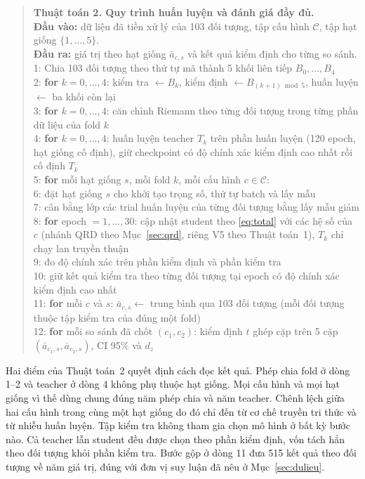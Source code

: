 \begin{quote}
\ttfamily\small\raggedright
\noindent\textbf{Thuật toán 2. Quy trình huấn luyện và đánh giá đầy đủ.}\\[2pt]
\textbf{Đầu vào:} dữ liệu đã tiền xử lý của 103 đối tượng, tập cấu hình
$\mathcal{C}$, tập hạt giống $\{1,\ldots,5\}$.\\
\textbf{Đầu ra:} giá trị theo hạt giống $\bar{a}_{c,s}$ và kết quả kiểm
định cho từng so sánh.\\[4pt]
1: \quad Chia 103 đối tượng theo thứ tự mã thành 5 khối liên tiếp
$B_0,\ldots,B_4$\\
2: \quad \textbf{for} $k = 0,\ldots,4$: kiểm tra $\leftarrow B_k$, kiểm định
$\leftarrow B_{(k+1) \bmod 5}$, huấn luyện $\leftarrow$ ba khối còn lại\\
3: \quad \textbf{for} $k = 0,\ldots,4$: căn chỉnh Riemann theo từng đối
tượng trong từng phần dữ liệu của fold $k$\\
4: \quad \textbf{for} $k = 0,\ldots,4$: huấn luyện teacher $T_k$ trên phần
huấn luyện (120 epoch, hạt giống cố định), giữ checkpoint có độ chính xác
kiểm định cao nhất rồi cố định $T_k$\\[4pt]
5: \quad \textbf{for} mỗi hạt giống $s$, mỗi fold $k$, mỗi cấu hình
$c \in \mathcal{C}$:\\
6: \quad \quad đặt hạt giống $s$ cho khởi tạo trọng số, thứ tự batch và
lấy mẫu\\
7: \quad \quad cân bằng lớp các trial huấn luyện của từng đối tượng bằng
lấy mẫu giảm\\
8: \quad \quad \textbf{for} epoch $= 1,\ldots,30$: cập nhật student theo
\eqref{eq:total} với các hệ số của $c$ (nhánh QRD theo Mục~\ref{sec:qrd},
riêng V5 theo Thuật toán~1), $T_k$ chỉ chạy lan truyền thuận\\
9: \quad \quad \quad đo độ chính xác trên phần kiểm định và phần kiểm tra\\
10: \quad \quad giữ kết quả kiểm tra theo từng đối tượng tại epoch có độ
chính xác kiểm định cao nhất\\[4pt]
11: \quad \textbf{for} mỗi $c$ và $s$: $\bar{a}_{c,s} \leftarrow$ trung bình
qua 103 đối tượng (mỗi đối tượng thuộc tập kiểm tra của đúng một fold)\\
12: \quad \textbf{for} mỗi so sánh đã chốt $(c_1, c_2)$: kiểm định $t$ ghép
cặp trên 5 cặp $(\bar{a}_{c_1,s}, \bar{a}_{c_2,s})$, CI 95\% và $d_z$
\end{quote}

Hai điểm của Thuật toán~2 quyết định cách đọc kết quả. Phép chia fold ở dòng 1--2 và teacher ở dòng 4 không phụ thuộc hạt giống.
Mọi cấu hình và mọi hạt giống vì thế dùng chung đúng năm phép chia và năm
teacher. Chênh lệch giữa hai
cấu hình trong cùng một hạt giống do đó chỉ đến từ cơ chế truyền tri thức
và từ nhiễu huấn luyện. Tập kiểm tra không tham gia chọn mô hình ở bất kỳ
bước nào. Cả teacher lẫn student đều được chọn theo phần kiểm định, vốn tách
hẳn theo đối tượng khỏi phần kiểm tra. Bước gộp ở dòng 11 đưa 515 kết quả
theo đối tượng về năm giá trị, đúng với đơn vị suy luận đã nêu ở
Mục~\ref{sec:dulieu}.

